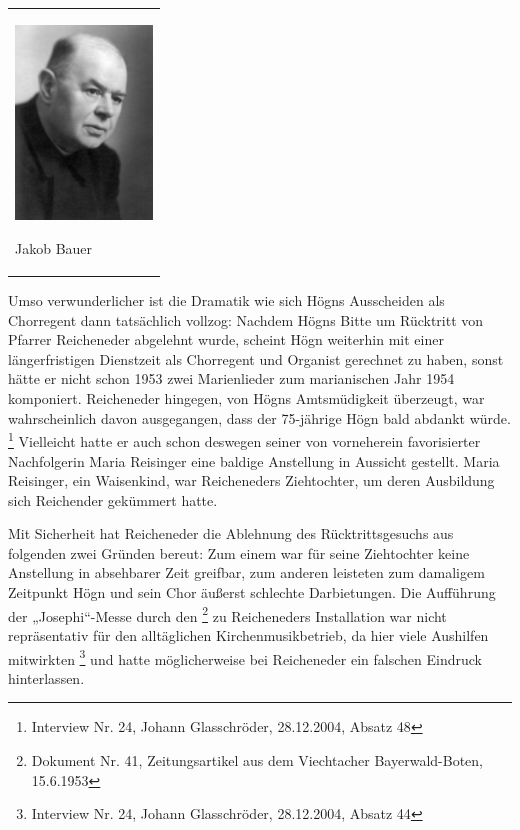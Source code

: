 \begin{center}
\begin{minipage}{4.032cm}
\begin{flushleft}
\tablefirsthead{}
\tablehead{}
\tabletail{}
\tablelasttail{}
\begin{supertabular}{m{3.832cm}}

\includegraphics[width=3.651cm,height=5.177cm]{pictures/zulassungsarbeit-img046.jpg}

Jakob Bauer\\
\end{supertabular}
\end{flushleft}
\end{minipage}
\end{center}
Umso verwunderlicher ist die Dramatik wie sich Högns Ausscheiden als
Chorregent dann tatsächlich vollzog: Nachdem Högns Bitte um Rücktritt
von Pfarrer Reicheneder abgelehnt wurde, scheint Högn weiterhin mit
einer längerfristigen Dienstzeit als Chorregent und Organist gerechnet
zu haben, sonst hätte er nicht schon 1953 zwei Marienlieder zum
marianischen Jahr 1954 komponiert. Reicheneder hingegen, von Högns
Amtsmüdigkeit überzeugt, war wahrscheinlich davon ausgegangen, dass der
75-jährige Högn bald abdankt würde. \footnote{Interview Nr. 24, Johann
Glasschröder, 28.12.2004, Absatz 48} Vielleicht hatte er auch schon
deswegen seiner von vorneherein favorisierter Nachfolgerin Maria
Reisinger eine baldige Anstellung in Aussicht gestellt. Maria
Reisinger, ein Waisenkind, war Reicheneders Ziehtochter, um deren
Ausbildung sich Reichender gekümmert hatte.

Mit Sicherheit hat Reicheneder die Ablehnung des Rücktrittsgesuchs aus
folgenden zwei Gründen bereut: Zum einem war für seine Ziehtochter
keine Anstellung in absehbarer Zeit greifbar, zum anderen leisteten zum
damaligem Zeitpunkt Högn und sein Chor äußerst schlechte Darbietungen.
Die Aufführung der „Josephi“-Messe durch den
\footnote{Dokument Nr. 41, Zeitungsartikel aus dem Viechtacher
Bayerwald-Boten, 15.6.1953} zu Reicheneders Installation war nicht
repräsentativ für den alltäglichen Kirchenmusikbetrieb, da hier viele
Aushilfen mitwirkten \footnote{Interview Nr. 24, Johann Glasschröder,
28.12.2004, Absatz 44} und hatte möglicherweise bei Reicheneder ein
falschen Eindruck hinterlassen.

